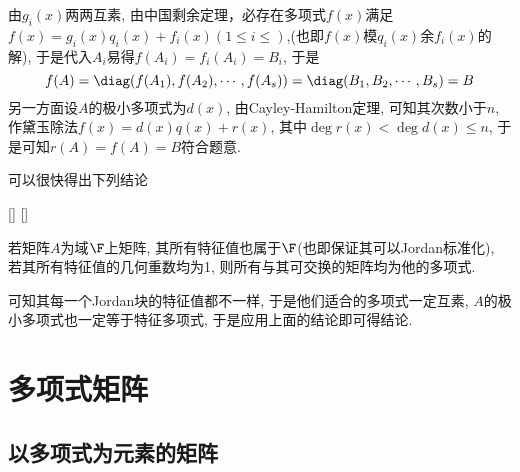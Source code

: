 \documentclass[UTF8]{ctexart}
\begin{document}
		\begin{prf}
			由$g_i(x)$两两互素, 由中国剩余定理，必存在多项式$f(x)$满足$f(x)=g_i(x)q_i(x)+f_i(x)(1\leq i\leq)$,(也即$f(x)$模$q_i(x)$余$f_i(x)$的解), 于是代入$A_i$易得$f(A_i)=f_i(A_i)=B_i$, 于是
			\[f(A)=\diag(f(A_1),f(A_2),\cdots,f(A_s))=\diag(B_1,B_2,\cdots,B_s)=B\]
			另一方面设$A$的极小多项式为$d(x)$, 由Cayley-Hamilton定理, 可知其次数小于$n$, 作黛玉除法$f(x)=d(x)q(x)+r(x)$, 其中$\deg r(x)<\deg d(x)\leq n$, 于是可知$r(A)=f(A)=B$符合题意.
		\end{prf}
		可以很快得出下列结论
		\begin{crl}
			[]
			{}
			[]
			[]
			
			若矩阵$A$为域$\F$上矩阵, 其所有特征值也属于$\F$(也即保证其可以Jordan标准化), 若其所有特征值的几何重数均为1, 则所有与其可交换的矩阵均为他的多项式.
		\end{crl}

		\begin{prf}
			可知其每一个Jordan块的特征值都不一样, 于是他们适合的多项式一定互素, $A$的极小多项式也一定等于特征多项式, 于是应用上面的结论即可得结论.
		\end{prf}

\section{多项式矩阵}

    \subsection{以多项式为元素的矩阵}
    
\end{document}
